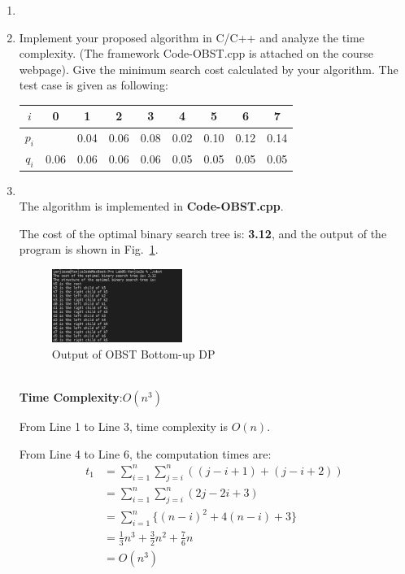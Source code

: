 \documentclass[12pt,a4paper]{article}
\makeatletter
\newtheorem*{solution}{Solution}
\theoremstyle{definition}
\renewenvironment{solution}[1][Solution] {\par\pushQED{\qed}\normalfont\topsep6\p@\@plus6\p@\relax\trivlist\item[\hskip\labelsep\bfseries#1\@addpunct{.}]\ignorespaces}{\popQED\endtrivlist\@endpefalse} \makeatother
\makeatother
\begin{document}
\begin{enumerate}
\begin{enumerate}
\begin{solution}
\begin{algorithm}[H]
        	\end{algorithm}
			\end{solution}
			\item Implement your proposed algorithm in C/C++ and analyze the time complexity. ({\color{blue}The framework Code-OBST.cpp is attached on the course webpage}). Give the minimum search cost calculated by your algorithm. The test case is given as following:
			\begin{table}[H]
				\setlength{\abovecaptionskip}{0cm}
				\setlength{\belowcaptionskip}{0.1cm}
				\centering		
				\begin{tabular}{|c|cccccccc|}
					\hline
					$ i $&0&1&2&3&4&5&6&7\\
					\hline
					$ p_{i} $&&0.04&0.06&0.08&0.02&0.10&0.12&0.14\\
					\hline
					$ q_{i} $&0.06&0.06&0.06&0.06&0.05&0.05&0.05&0.05\\
					\hline
				\end{tabular}
			\end{table}
			\begin{solution}
			~\\
			The algorithm is implemented in \textbf{Code-OBST.cpp}.
			
			The cost of the optimal binary search tree is: \textbf{3.12}, and the output of the program is shown in Fig.~\ref{result}.
			
			 \begin{figure}[htbp]
                \centering
                \includegraphics[width=0.4\textwidth]{Lab05-YanjieZe/result.png}
                \caption{Output of OBST Bottom-up DP}\label{result}
            \end{figure}
			
			~\\
			\textbf{Time Complexity}:$O(n^3)$
			
			From Line 1 to Line 3, time complexity is $O(n)$.
			
			From Line 4 to Line 6, the computation times are:
			\begin{equation}
			   \begin{split}
			\displaystyle t_1 &=  \sum_{i=1}^{n}\sum_{j=i}^{n}\left( (j-i+1)+(j-i+2) \right)\\
			& =  \sum_{i=1}^{n}\sum_{j=i}^{n}(2j-2i+3)\\
			&= \sum_{i=1}^{n} \{ (n-i)^2 + 4(n-i) + 3\} \\
			& = \frac 13 n^3 + \frac 32 n^2 + \frac 76 n \\
			& = O(n^3)
		      \end{split} 
			\end{equation}
			

\end{solution}
\end{enumerate}
\end{enumerate}
\end{document}
